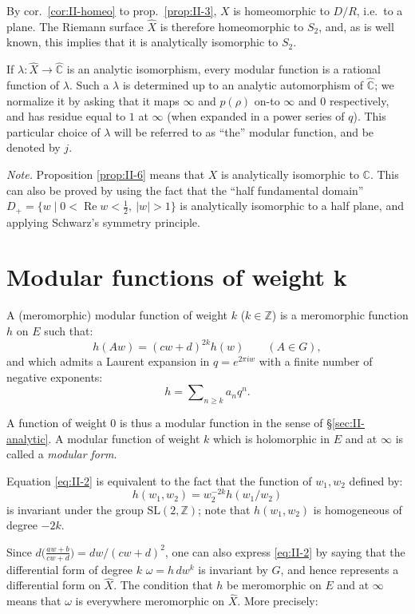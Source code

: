 By cor.~\ref{cor:II-homeo} to prop.~\ref{prop:II-3}, $X$ is homeomorphic
to $D/R$, i.e.\ to a plane. The Riemann surface $\hat{X}$ is therefore
homeomorphic to $S_{2}$, and, as is well known, this implies that it is
analytically isomorphic to $S_{2}$.

If $\lambda:\hat{X}\longrightarrow\hat{\mathbb{C}}$ is an analytic
isomorphism, every modular function is a rational function of $\lambda$.
Such a $\lambda$ is determined up to an analytic automorphism of
$\hat{\mathbb{C}}$; we normalize it by asking that it maps $\infty$ and
$p(\rho)$ on-to $\infty$ and $0$ respectively, and has residue equal to
$1$ at $\infty$ (when expanded in a power series of $q$). This particular
choice of $\lambda$ will be referred to as ``the'' modular function, and
be denoted by $j$.

\noindent\emph{Note.} Proposition \ref{prop:II-6} means that $X$ is
analytically isomorphic to $\mathbb{C}$. This can also be proved by using
the fact that the ``half fundamental domain''
$D_{+}=\{w\mid 0<\operatorname{Re}w<\frac{1}{2},\ |w|>1\}$ is analytically
isomorphic to a half plane, and applying Schwarz's symmetry principle.

\section{Modular functions of weight k}\label{sec:II-weight}

A (meromorphic) modular function of weight $k$ ($k\in\mathbb{Z}$) is a
meromorphic function $h$ on $E$ such that:
\[
h(Aw)=(cw+d)^{2k}h(w)\qquad(A\in G),
\tag{2}\label{eq:II-2}
\]
and which admits a Laurent expansion in $q=e^{2\pi iw}$ with a finite
number of negative exponents:
\[
h=\sum\nolimits_{n\geq k}a_{n}q^{n}.
\]

A function of weight $0$ is thus a modular function in the sense of
§\ref{sec:II-analytic}. A modular function of weight $k$ which is
holomorphic in $E$ and at $\infty$ is called a \emph{modular form}.

Equation \eqref{eq:II-2} is equivalent to the fact that the function of
$w_{1},w_{2}$ defined by:
\[
h(w_{1},w_{2})=w_{2}^{-2k}h(w_{1}/w_{2})
\]
is invariant under the group $\mathrm{SL}(2,\mathbb{Z})$; note that
$h(w_{1},w_{2})$ is homogeneous of degree $-2k$.

Since $d\bigl(\frac{aw+b}{cw+d}\bigr)=dw/(cw+d)^{2}$, one can also express
\eqref{eq:II-2} by saying that the differential form of degree $k$
$\omega=h\,dw^{k}$ is invariant by $G$, and hence represents a differential
form on $\hat{X}$. The condition that $h$ be meromorphic on $E$ and at
$\infty$ means that $\omega$ is everywhere meromorphic on $\hat{X}$. More
precisely:

